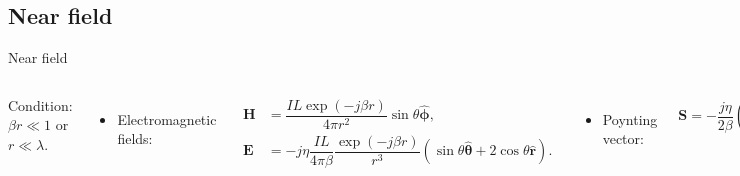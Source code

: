 \subsection{Near field}

\begin{frame}{Near field}
    \begin{columns}
        Condition: \( \beta r \ll 1 \) or \( r \ll \lambda \). 
        \begin{itemize}
            \item Electromagnetic fields:
        \end{itemize}
        \begin{align*}
            \mathbf{H} &= \dfrac{ I L \exp ( -j \beta r ) }{4 \pi r^2} \sin \theta \mathbf{ \hat{\phi} }, \\
            \mathbf{E} &= - j \eta \dfrac{I L}{4 \pi \beta} \dfrac{\exp ( - j \beta r )}{r^3} \left( \sin \theta \mathbf{ \hat{\theta} } + 2 \cos \theta \mathbf{ \hat{r} } \right).
        \end{align*}
        \begin{itemize}
            \item Poynting vector:
        \end{itemize}
        \begin{equation*}
           \mathbf{S} = - \dfrac{ j \eta }{2 \beta} \left( \dfrac{I L}{4 \pi} \right)^2 \dfrac{1}{r^5} \left( \sin^2 \theta \mathbf{\hat{r}} - \sin 2 \theta \mathbf{\hat{\theta}} \right). 
        \end{equation*}
        
        \vspace{3mm}
        Power transfer by mutual induction.
        Near field properties:
        \begin{itemize}
            \item Electrostatic field.
            \item No Radiation Loss.
        \end{itemize}
        \begin{figure}
            \centering
            \includegraphics{Figures/Electrostatic_dipole.pdf}
            \caption{Electrostatic dipole model.}
            \label{fig:Electrostatic_diople}
        \end{figure}
    \end{columns}
\end{frame}

